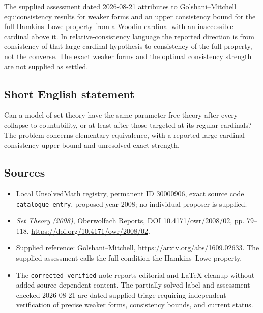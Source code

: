 \documentclass[11pt]{article}
\begin{document}
The supplied assessment dated 2026-08-21 attributes to Golshani--Mitchell equiconsistency results for weaker forms and an upper consistency bound for the full Hamkins--Lowe property from a Woodin cardinal with an inaccessible cardinal above it. In relative-consistency language the reported direction is from consistency of that large-cardinal hypothesis to consistency of the full property, not the converse. The exact weaker forms and the optimal consistency strength are not supplied as settled.
\subsection{Short English statement}
Can a model of set theory have the same parameter-free theory after every collapse to countability, or at least after those targeted at its regular cardinals? The problem concerns elementary equivalence, with a reported large-cardinal consistency upper bound and unresolved exact strength.
\subsection{Sources}
\begin{itemize}
\item Local UnsolvedMath registry, permanent ID \(30000906\), exact source code \texttt{catalogue entry}, proposed year 2008; no individual proposer is supplied.
\item \emph{Set Theory (2008)}, Oberwolfach Reports, DOI 10.4171/owr/2008/02, pp. 79--118. \url{https://doi.org/10.4171/owr/2008/02}.
\item Supplied reference: Golshani--Mitchell, \url{https://arxiv.org/abs/1609.02633}. The supplied assessment calls the full condition the Hamkins--Lowe property.
\item The \texttt{corrected\_verified} note reports editorial and LaTeX cleanup without added source-dependent content. The partially solved label and assessment checked 2026-08-21 are dated supplied triage requiring independent verification of precise weaker forms, consistency bounds, and current status.
\end{itemize}
\end{document}
